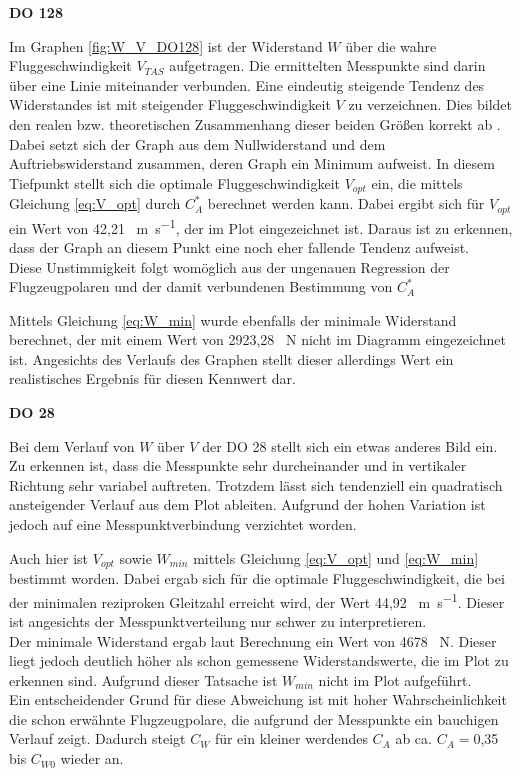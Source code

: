 \textbf{DO 128}

Im Graphen \ref{fig:W_V_DO128} ist der Widerstand $W$ über die wahre Fluggeschwindigkeit $V_{TAS}$ aufgetragen. Die ermittelten Messpunkte sind darin über eine Linie miteinander verbunden. Eine eindeutig steigende Tendenz des Widerstandes ist mit steigender Fluggeschwindigkeit $V$ zu verzeichnen. Dies bildet den realen bzw. theoretischen Zusammenhang dieser beiden Größen korrekt ab \cite{Skript}. \\ Dabei setzt sich der Graph aus dem Nullwiderstand und dem Auftriebswiderstand zusammen, deren Graph ein Minimum aufweist.
In diesem Tiefpunkt stellt sich die optimale Fluggeschwindigkeit $V_{opt}$ ein, die mittels Gleichung \ref{eq:V_opt} durch $C_A^*$ berechnet werden kann. Dabei ergibt sich für $V_{opt}$ ein Wert von 42,21 \SI{}{\meter\per\second}, der im Plot eingezeichnet ist. Daraus ist zu erkennen, dass der Graph an diesem Punkt eine noch eher fallende Tendenz aufweist. \\ Diese Unstimmigkeit folgt womöglich aus der ungenauen Regression der Flugzeugpolaren und der damit verbundenen Bestimmung von $C_A^*$

Mittels Gleichung \ref{eq:W_min} wurde ebenfalls der minimale Widerstand berechnet, der mit einem Wert von 2923,28 \SI{}{\newton} nicht im Diagramm eingezeichnet ist. Angesichts des Verlaufs des Graphen stellt dieser allerdings Wert ein realistisches Ergebnis für diesen Kennwert dar.

\textbf{DO 28}

Bei dem Verlauf von $W$ über $V$ der DO 28 stellt sich ein etwas anderes Bild ein. \\ Zu erkennen ist, dass die Messpunkte sehr durcheinander und in vertikaler Richtung sehr variabel auftreten. Trotzdem lässt sich tendenziell ein quadratisch ansteigender Verlauf aus dem Plot ableiten. Aufgrund der hohen Variation ist jedoch auf eine Messpunktverbindung verzichtet worden.

Auch hier ist $V_{opt}$ sowie $W_{min}$ mittels Gleichung \ref{eq:V_opt} und \ref{eq:W_min} bestimmt worden. Dabei ergab sich für die optimale Fluggeschwindigkeit, die bei der minimalen reziproken Gleitzahl erreicht wird, der Wert 44,92 \SI{}{\meter\per\second}. Dieser ist angesichts der Messpunktverteilung nur schwer zu interpretieren. \\ Der minimale Widerstand ergab laut Berechnung ein Wert von 4678 \SI{}{\newton}. Dieser liegt jedoch deutlich höher als schon gemessene Widerstandswerte, die im Plot zu erkennen sind. Aufgrund dieser Tatsache ist $W_{min}$ nicht im Plot aufgeführt. \\
Ein entscheidender Grund für diese Abweichung ist mit hoher Wahrscheinlichkeit die schon erwähnte Flugzeugpolare, die aufgrund der Messpunkte ein bauchigen Verlauf zeigt. Dadurch steigt $C_W$ für ein kleiner werdendes $C_A$ ab ca. $C_A=$0,35 bis $C_{W0}$ wieder an.

